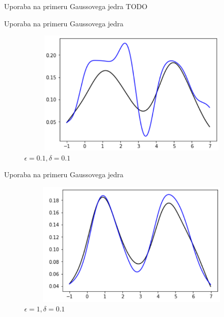 \documentclass{beamer}
\begin{document}
\begin{frame}{Uporaba na primeru Gaussovega jedra}
TODO
\end{frame}

\begin{frame}{Uporaba na primeru Gaussovega jedra}
\begin{figure}
\centering
\includegraphics[width = 12cm, height = 6cm]{prva}
\caption{$\epsilon = 0.1, \delta = 0.1$}
\end{figure}

\end{frame}

\begin{frame}{Uporaba na primeru Gaussovega jedra}

\begin{figure}
\centering
\includegraphics[width = 12cm, height = 6cm]{druga}
\caption{$\epsilon = 1, \delta = 0.1$}
\end{figure}
\end{frame}
\end{document}
